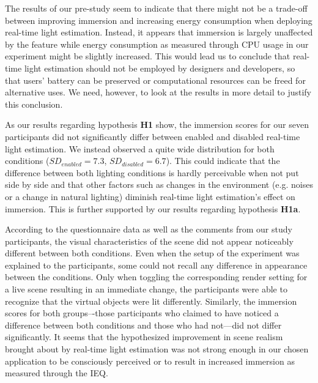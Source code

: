 \documentclass[12pt,twoside,english]{article}
\begin{document}
The results of our pre-study seem to indicate that there might not be a trade-off between improving immersion and increasing energy consumption when deploying real-time light estimation.
Instead, it appears that immersion is largely unaffected by the feature while energy consumption as measured through \gls{CPU} usage in our experiment might be slightly increased.
This would lead us to conclude that real-time light estimation should not be employed by designers and developers, so that users' battery can be preserved or computational resources can be freed for alternative uses.
We need, however, to look at the results in more detail to justify this conclusion.

As our results regarding hypothesis \textbf{H1} show, the immersion scores for our seven participants did not significantly differ between enabled and disabled real-time light estimation.
We instead observed a quite wide distribution for both conditions ($ SD_{enabled} = 7.3 $, $ SD_{disabled} = 6.7 $).
This could indicate that the difference between both lighting conditions is hardly perceivable when not put side by side and that other factors such as changes in the environment (e.g. noises or a change in natural lighting) diminish real-time light estimation's effect on immersion.
This is further supported by our results regarding hypothesis \textbf{H1a}.

According to the questionnaire data as well as the comments from our study participants, the visual characteristics of the scene did not appear noticeably different between both conditions.
Even when the setup of the experiment was explained to the participants, some could not recall any difference in appearance between the conditions.
Only when toggling the corresponding render setting for a live scene resulting in an immediate change, the participants were able to recognize that the virtual objects were lit differently.
Similarly, the immersion scores for both groups–-those participants who claimed to have noticed a difference between both conditions and those who had not---did not differ significantly.
It seems that the hypothesized improvement in scene realism brought about by real-time light estimation was not strong enough in our chosen application to be consciously perceived or to result in increased immersion as measured through the \gls{IEQ}.
\end{document}
